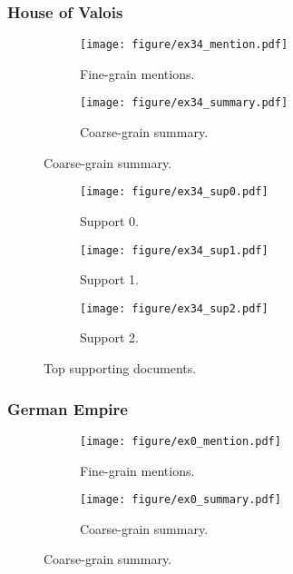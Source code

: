 \documentclass{article} \usepackage{iclr2019_conference,times}
\begin{document}
\clearpage


\subsubsection{House of Valois}

\begin{figure}[!h]
\begin{subfigure}{0.69\linewidth}
  \centering
  \texttt{[image: figure/ex34\_mention.pdf]}
  \caption{Fine-grain mentions.}
\end{subfigure}
\begin{subfigure}{0.29\linewidth}
  \centering
  \texttt{[image: figure/ex34\_summary.pdf]}
  \caption{Coarse-grain summary.}
\end{subfigure}
\end{figure}


\begin{figure}[!h]
\begin{subfigure}{0.325\linewidth}
  \centering
  \caption{Support 0.}
  \texttt{[image: figure/ex34\_sup0.pdf]}
\end{subfigure}
\begin{subfigure}{0.325\linewidth}
  \centering
  \caption{Support 1.}
  \texttt{[image: figure/ex34\_sup1.pdf]}
\end{subfigure}
\begin{subfigure}{0.325\linewidth}
  \centering
  \caption{Support 2.}
  \texttt{[image: figure/ex34\_sup2.pdf]}
\end{subfigure}
\caption{Top supporting documents.}
\end{figure}





\clearpage

\subsubsection{German Empire}

\begin{figure}[!h]
\begin{subfigure}{0.59\linewidth}
  \centering
  \texttt{[image: figure/ex0\_mention.pdf]}
  \caption{Fine-grain mentions.}
\end{subfigure}
\begin{subfigure}{0.39\linewidth}
  \centering
  \texttt{[image: figure/ex0\_summary.pdf]}
  \caption{Coarse-grain summary.}
\end{subfigure}
\end{figure}
\end{document}
